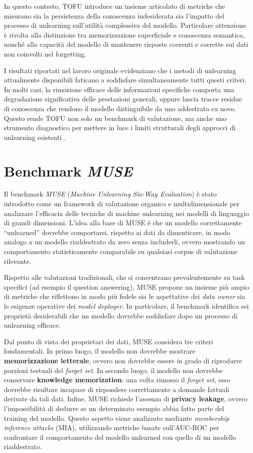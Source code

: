 In questo contesto, TOFU introduce un insieme articolato di metriche che misurano sia la persistenza della conoscenza indesiderata sia l’impatto del processo di unlearning sull’utilità complessiva del modello.  
Particolare attenzione è rivolta alla distinzione tra memorizzazione superficiale e conoscenza semantica, nonché alla capacità del modello di mantenere risposte coerenti e corrette sui dati non coinvolti nel forgetting.

I risultati riportati nel lavoro originale evidenziano che i metodi di unlearning attualmente disponibili faticano a soddisfare simultaneamente tutti questi criteri.  
In molti casi, la rimozione efficace delle informazioni specifiche comporta una degradazione significativa delle prestazioni generali, oppure lascia tracce residue di conoscenza che rendono il modello distinguibile da uno addestrato ex novo.  
Questo rende TOFU non solo un benchmark di valutazione, ma anche uno strumento diagnostico per mettere in luce i limiti strutturali degli approcci di unlearning esistenti \cite{maini2024tofu}.

\section{Benchmark \emph{MUSE}}

Il benchmark \textit{MUSE} (\emph{Machine Unlearning Six-Way Evaluation}) \cite{shi2025muse} è stato introdotto come un framework di valutazione organico e multidimensionale per analizzare l’efficacia delle tecniche di machine unlearning nei modelli di linguaggio di grandi dimensioni.  
L’idea alla base di MUSE è che un modello correttamente “unlearned” dovrebbe comportarsi, rispetto ai dati da dimenticare, in modo analogo a un modello riaddestrato da zero senza includerli, ovvero mostrando un comportamento statisticamente comparabile su qualsiasi corpus di valutazione rilevante.

Rispetto alle valutazioni tradizionali, che si concentrano prevalentemente su task specifici (ad esempio il question answering), MUSE propone un insieme più ampio di metriche che riflettono in modo più fedele sia le aspettative dei \emph{data owner} sia le esigenze operative dei \emph{model deployer}. In particolare, il benchmark identifica sei proprietà desiderabili che un modello dovrebbe soddisfare dopo un processo di unlearning efficace.

Dal punto di vista dei proprietari dei dati, MUSE considera tre criteri fondamentali.  
In primo luogo, il modello non dovrebbe mostrare \textbf{memorizzazione letterale}, ovvero non dovrebbe essere in grado di riprodurre porzioni testuali del \emph{forget set}. 
In secondo luogo, il modello non dovrebbe conservare \textbf{knowledge memorization}: una volta rimosso il \emph{forget set}, esso dovrebbe risultare incapace di rispondere correttamente a domande fattuali derivate da tali dati.
Infine, MUSE richiede l’assenza di \textbf{privacy leakage}, ovvero l’impossibilità di dedurre se un determinato esempio abbia fatto parte del training del modello. Questo aspetto viene analizzato mediante \emph{membership inference attacks} (MIA), utilizzando metriche basate sull’AUC-ROC per confrontare il comportamento del modello unlearned con quello di un modello riaddestrato.


